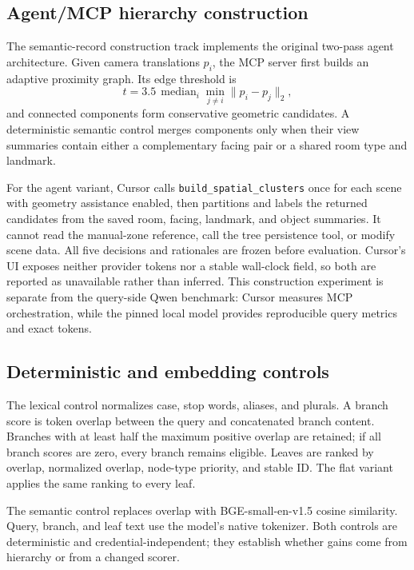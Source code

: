 \documentclass[runningheads]{llncs}
\begin{document}
\subsection{Agent/MCP hierarchy construction}
\label{sec:mcpconstruction}
The semantic-record construction track implements the original two-pass
agent architecture. Given camera translations $p_i$, the MCP server first
builds an adaptive proximity graph. Its edge threshold is
\begin{equation}
t=3.5\,\operatorname{median}_i\min_{j\ne i}\lVert p_i-p_j\rVert_2 ,
\end{equation}
and connected components form conservative geometric candidates. A
deterministic semantic control merges components only when their view
summaries contain either a complementary facing pair or a shared room type
and landmark.

For the agent variant, Cursor calls
\texttt{build\_spatial\_clusters} once for each scene with geometry assistance
enabled, then partitions and labels the returned candidates from the saved
room, facing, landmark, and object summaries. It cannot read the manual-zone
reference, call the tree persistence tool, or modify scene data. All five
decisions and rationales are frozen before evaluation. Cursor's UI exposes
neither provider tokens nor a stable wall-clock field, so both are reported
as unavailable rather than inferred. This construction experiment is separate
from the query-side Qwen benchmark: Cursor measures MCP orchestration, while
the pinned local model provides reproducible query metrics and exact tokens.

\subsection{Deterministic and embedding controls}
The lexical control normalizes case, stop words, aliases, and plurals. A branch
score is token overlap between the query and concatenated branch content.
Branches with at least half the maximum positive overlap are retained; if all
branch scores are zero, every branch remains eligible. Leaves are ranked by
overlap, normalized overlap, node-type priority, and stable ID. The flat
variant applies the same ranking to every leaf.

The semantic control replaces overlap with BGE-small-en-v1.5 cosine
similarity. Query, branch, and leaf text use the model's native tokenizer.
Both controls are deterministic and credential-independent; they establish
whether gains come from hierarchy or from a changed scorer.
\end{document}
